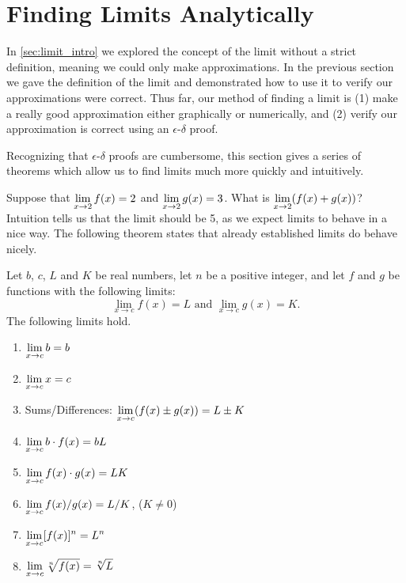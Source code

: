 \section{Finding Limits Analytically}\label{sec:limit_analytically}

In \autoref{sec:limit_intro} we explored the concept of the limit without a strict definition, meaning we could only make approximations. In the previous section we gave the definition of the limit and demonstrated how to use it to verify our approximations were correct. Thus far, our method of finding a limit is (1) make a really good approximation either graphically or numerically, and (2) verify our approximation is correct using an $\epsilon$-$\delta$ proof.

Recognizing that $\epsilon$-$\delta$ proofs are cumbersome, this section gives a series of theorems which allow us to find limits much more quickly and intuitively. \bigskip

Suppose that $\displaystyle\lim_{x\to 2} f(x)=2$ and $\displaystyle\lim_{x\to 2} g(x) = 3$. What is $\displaystyle\lim_{x\to 2}(f(x)+g(x))$? Intuition tells us that the limit should be 5, as we expect limits to behave in a nice way. The following theorem states that already established limits do behave nicely.

\begin{theorem}\label{thm:limit_algebra}%
Let $b$, $c$, $L$ and $K$ be real numbers, let $n$ be a positive integer, and let $f$ and $g$ be functions with the following limits: 
\[\lim_{x\to c}f(x) = L \text{\ and\ } \lim_{x\to c} g(x) = K.\]
The following limits hold.
\begin{enumerate}
\settowidth{\widest}{Sums/Differences:}
\item {} $\displaystyle\lim_{x\to c} b = b$
\item {} $\displaystyle\lim_{x\to c} x = c$
\item Sums/Differences: $\displaystyle\lim_{x\to c}(f(x)\pm g(x)) = L\pm K$
\item {} $\displaystyle\lim_{x\to c} b\cdot f(x) = bL$
\item {} $\displaystyle\lim_{x\to c} f(x)\cdot g(x) = LK$
\item {} $\displaystyle\lim_{x\to c} f(x)/g(x) = L/K$, ($K\neq 0$)
\item {} $\displaystyle\lim_{x\to c} [f(x)]^n = L^n$
\item {} $\displaystyle\lim_{x\to c} \sqrt[n]{f(x)} = \sqrt[n]{L}$ 
\end{enumerate}
\end{theorem}

